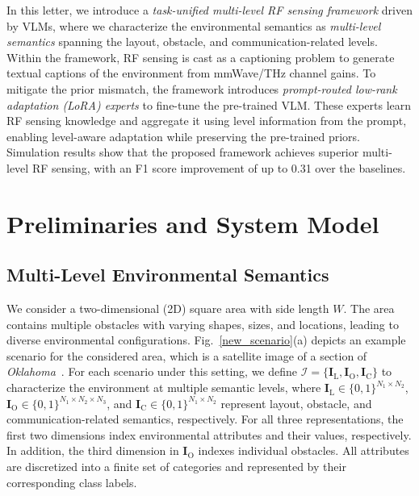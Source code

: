 \documentclass[journal,12pt,onecolumn,draftclsnofoot]{IEEEtran}
\newcommand\IC{\ensuremath{\mathcal{I}}}
\newcommand\FIF{\ensuremath{\mathbf{I}}}
\newcommand\CR{\ensuremath{\mathrm{C}}}
\newcommand\LR{\ensuremath{\mathrm{L}}}
\newcommand\ROR{\ensuremath{\mathrm{O}}}
\begin{document}
In this letter, we introduce a \emph{task-unified multi-level RF sensing framework} driven by VLMs, where we characterize the environmental semantics as \emph{multi-level semantics} spanning the layout, obstacle, and communication-related levels. Within the framework, RF sensing is cast as a captioning problem to generate textual captions of the environment from mmWave/THz channel gains. To mitigate the prior mismatch, the framework introduces \emph{prompt-routed low-rank adaptation (LoRA) experts} to fine-tune the pre-trained VLM. These experts learn RF sensing knowledge and aggregate it using level information from the prompt, enabling level-aware adaptation while preserving the pre-trained priors. Simulation results show that the proposed framework achieves superior multi-level RF sensing, with an F1 score improvement of up to 0.31 over the baselines.



\section{Preliminaries and System Model}

\subsection{Multi-Level Environmental Semantics}

We consider a two-dimensional (2D) square area with side length $W$. The area contains multiple obstacles with varying shapes, sizes, and locations, leading to diverse environmental configurations. Fig.~\ref{new_scenario}(a) depicts an example scenario for the considered area, which is a satellite image of a section of {\it Oklahoma}~\cite{Alkhateeb2019}. For each scenario under this setting, we define
$\IC=\{\FIF_{\LR},\FIF_{\ROR},\FIF_{\CR}\}$ to characterize the environment at multiple semantic levels,
where $\FIF_{\LR}\in\{0,1\}^{N_{1}\times N_{2}}$, $\FIF_{\ROR}\in\{0,1\}^{N_{1}\times N_{2}\times N_{3}}$, and $\FIF_{\CR}\in\{0,1\}^{N_{1}\times N_{2}}$ represent layout, obstacle, and communication-related semantics, respectively. For all three representations, the first two dimensions index environmental attributes and their values, respectively. In addition, the third dimension in $\FIF_{\ROR}$ indexes individual obstacles. All attributes are discretized into a finite set of categories and represented by their corresponding class labels.
\end{document}
